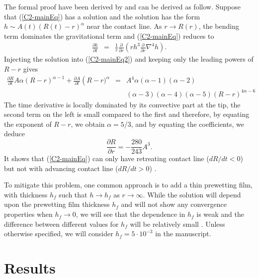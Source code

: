 The formal proof  have been derived by  \citet{Flitton:1999iv} and can
be derived  as follow. Suppose  that (\ref{C2-mainEq}) has  a solution
and the solution has the  form $h \sim A(t)(R(t)-r)^{\alpha}$ near the
contact line.  As $r \rightarrow R(r)$, the bending term dominates the
gravitational term and (\ref{C2-mainEq}) reduces to
\begin{eqnarray}
  \frac{\partial       h}{\partial       t}&      =&\frac{1}{       r}
                                                     \frac{\partial}{\partial r}\left( rh^3 \frac{\partial}{\partial r}\nabla^4h\right).
                                                     \label{C2-mainEq2}
\end{eqnarray}
Injecting the  solution into  (\ref{C2-mainEq2}) and keeping  only the
leading powers of $R-r$ gives
\begin{eqnarray}
  \frac{\partial    R}{\partial    t}    A\alpha\left(R-r\right)^{\alpha-1}+
  \frac{\partial           A}{\partial           t}\left(R-r)^{\alpha}
  &=&A^4\alpha(\alpha-1)(\alpha-2)\nonumber\\
  &&(\alpha-3)(\alpha-4)(\alpha-5)(R-r)^{4\alpha-6}\nonumber
\end{eqnarray}
The time derivative is locally dominated by its convective part at the
tip, the second  term on the left  is small compared to  the first and
therefore,   by   equating   the   exponent  of   $R-r$,   we   obtain
$\alpha = 5/3$, and by equating the coefficients, we deduce
\begin{equation}
  \frac{\partial R}{\partial r} =-\frac{280}{243} A^3.
\end{equation}
It shows that (\ref{C2-mainEq}) can  only have retreating contact line
($dR/dt<0$)   but  not   with  advancing   contact  line   ($dR/dt>0$)
\citep{Lister:2013ia,Flitton:1999iv}.

To  mitigate this  problem,  one  common approach  is  to  add a  thin
prewetting film, with thickness $h_f$  such that $h\rightarrow h_f$ as
$r\rightarrow  \infty$.   While  the  solution will  depend  upon  the
prewetting  film thickness  $h_f$ and  will not  show any  convergence
properties when $h_f\rightarrow 0$, we will see that the dependence in
$h_f$ is  weak and the  difference between different values  for $h_f$
will  be  relatively  small  \citep{Lister:2013ia,Anonymous:QWXp_4JV}.
Unless otherwise specified, we will consider $h_f = 5\cdot 10^{-3}$ in
the manuscript.



\section{Results}
\label{C2-sec:regime-propagations}

